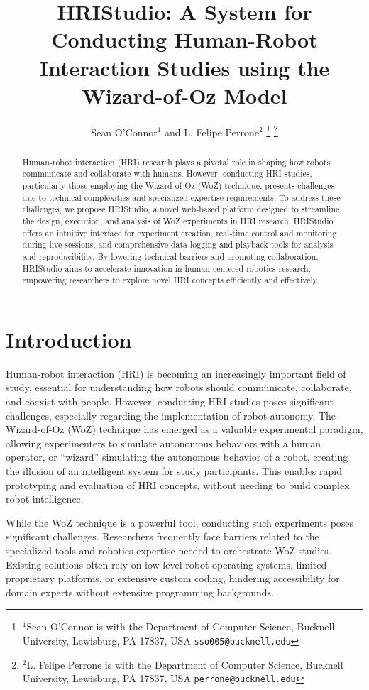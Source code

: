 \documentclass[letterpaper, 10 pt, conference]{ieeeconf}
\title{\LARGE \bf HRIStudio: A System for Conducting Human-Robot Interaction Studies using the Wizard-of-Oz Model}
\author{Sean O'Connor$^{1}$ and L. Felipe Perrone$^{2}$%
\thanks{$^{1}$Sean O'Connor is with the Department of Computer Science, 	
		Bucknell University, Lewisburg, PA 17837, USA
        {\tt\small sso005@bucknell.edu}}%
\thanks{$^{2}$L. Felipe Perrone is with the Department of Computer Science,
        Bucknell University, Lewisburg, PA 17837, USA
        {\tt\small perrone@bucknell.edu}}%
}
\begin{document}
\maketitle
\thispagestyle{empty}
\pagestyle{empty}


\begin{abstract}

Human-robot interaction (HRI) research plays a pivotal role in shaping how robots communicate and collaborate with humans. However, conducting HRI studies, particularly those employing the Wizard-of-Oz (WoZ) technique, presents challenges due to technical complexities and specialized expertise requirements. To address these challenges, we propose HRIStudio, a novel web-based platform designed to streamline the design, execution, and analysis of WoZ experiments in HRI research. HRIStudio offers an intuitive interface for experiment creation, real-time control and monitoring during live sessions, and comprehensive data logging and playback tools for analysis and reproducibility. By lowering technical barriers and promoting collaboration, HRIStudio aims to accelerate innovation in human-centered robotics research, empowering researchers to explore novel HRI concepts efficiently and effectively.

\end{abstract}


\section{Introduction}

Human-robot interaction (HRI) is becoming an increasingly important field of study, essential for understanding how robots should communicate, collaborate, and coexist with people. However, conducting HRI studies poses significant challenges, especially regarding the implementation of robot autonomy. The Wizard-of-Oz (WoZ) technique has emerged as a valuable experimental paradigm, allowing experimenters to simulate autonomous behaviors with a human operator, or ``wizard'' simulating the autonomous behavior of a robot, creating the illusion of an intelligent system for study participants. This enables rapid prototyping and evaluation of HRI concepts, without needing to build complex robot intelligence.

While the WoZ technique is a powerful tool, conducting such experiments poses significant challenges. Researchers frequently face barriers related to the specialized tools and robotics expertise needed to orchestrate WoZ studies. Existing solutions often rely on low-level robot operating systems, limited proprietary platforms, or extensive custom coding, hindering accessibility for domain experts without extensive programming backgrounds.
\end{document}
